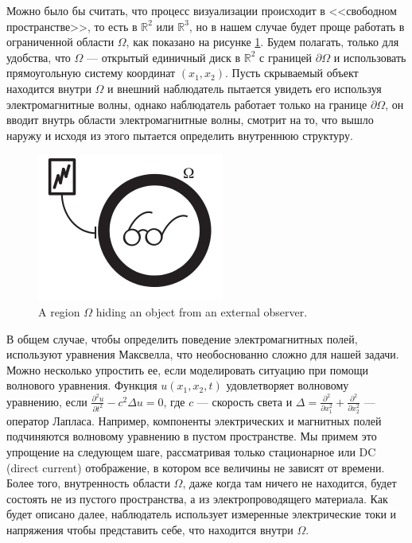 \documentclass[a4paper, 12pt]{article}
\begin{document}
Можно было бы считать, что процесс визуализации происходит в <<свободном пространстве>>, то есть в $\mathbb{R}^2$ или $\mathbb{R}^3$, но в нашем случае будет проще работать в ограниченной области $\Omega$, как показано на рисунке \ref{fig:1}. Будем полагать, только для удобства, что $\Omega$ --- открытый единичный диск в $\mathbb{R}^2$ с границей $\partial \Omega$ и использовать прямоугольную систему координат $(x_1, x_2)$. Пусть скрываемый объект находится внутри $\Omega$ и внешний наблюдатель пытается увидеть его используя электромагнитные волны, однако наблюдатель работает только на границе $\partial \Omega$, он вводит внутрь области электромагнитные волны, смотрит на то, что вышло наружу и исходя из этого пытается определить внутреннюю структуру.
\begin{figure}[t]
  \centering
  \includegraphics[height=0.15\paperheight]{1.png}
  \caption{A region $\Omega$ hiding an object from an external
    observer.}
  \label{fig:1}
\end{figure}

В общем случае, чтобы определить поведение электромагнитных полей, используют уравнения Максвелла, что необоснованно сложно для нашей задачи. Можно несколько упростить ее, если моделировать ситуацию при помощи волнового уравнения. Функция $u(x_1, x_2, t)$ удовлетворяет волновому уравнению, если $\frac{\partial^2 u}{\partial t^2} - c^2 \Delta u = 0$, где $c$ --- скорость света и $\Delta = \frac{\partial^2}{\partial x_1^2} + \frac{\partial^2}{\partial x_2^2}$ --- оператор Лапласа. Например, компоненты электрических и магнитных полей подчиняются волновому уравнению в пустом пространстве. Мы примем это упрощение на следующем шаге, рассматривая только стационарное или DC (direct current) отображение, в котором все величины не зависят от времени. Более того, внутренность области $\Omega$, даже когда там ничего не находится, будет состоять не из пустого пространства, а из электропроводящего материала. Как будет описано далее, наблюдатель использует измеренные электрические токи и напряжения чтобы представить себе, что находится внутри $\Omega$.
\end{document}
